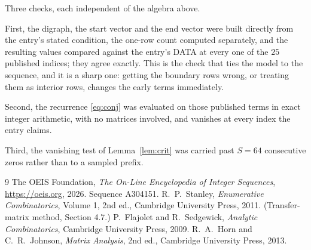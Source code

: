 \documentclass[11pt,a4paper]{article}
\theoremstyle{plain}
\theoremstyle{definition}
\begin{document}
Three checks, each independent of the algebra above.

First, the digraph, the start vector and the end vector were built directly from the
entry's stated condition, the one-row count computed separately, and the resulting values
compared against the entry's DATA at every one of the $25$ published indices; they
agree exactly. This is the check that ties the model to the sequence, and it is a sharp one:
getting the boundary rows wrong, or treating them as interior rows, changes the early terms
immediately.

Second, the recurrence \eqref{eq:conj} was evaluated on those published terms in exact
integer arithmetic, with no matrices involved, and vanishes at every index the entry claims.

Third, the vanishing test of Lemma~\ref{lem:crit} was carried past $S=64$ consecutive
zeros rather than to a sampled prefix.

\begin{thebibliography}{9}
 The OEIS Foundation, \emph{The On-Line Encyclopedia of Integer
Sequences}, \url{https://oeis.org}, 2026. Sequence A304151.
 R.~P.~Stanley, \emph{Enumerative Combinatorics}, Volume 1, 2nd ed.,
Cambridge University Press, 2011. (Transfer-matrix method, Section 4.7.)
 P.~Flajolet and R.~Sedgewick, \emph{Analytic Combinatorics}, Cambridge
University Press, 2009.
 R.~A.~Horn and C.~R.~Johnson, \emph{Matrix Analysis}, 2nd ed., Cambridge
University Press, 2013.
\end{thebibliography}
\end{document}
